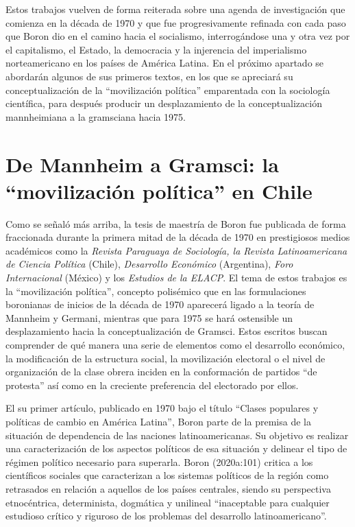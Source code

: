 Estos trabajos vuelven de forma reiterada sobre una agenda de investigación que comienza en la década de 1970 y que fue progresivamente refinada con cada paso que Boron dio en el camino hacia el socialismo, interrogándose una y otra vez por el capitalismo, el Estado, la democracia y la injerencia del imperialismo norteamericano en los países de América Latina. En el próximo apartado se abordarán algunos de sus primeros textos, en los que se apreciará su conceptualización de la \enquote{movilización política} emparentada con la sociología científica, para después producir un desplazamiento de la conceptualización mannheimiana a la gramsciana hacia 1975.

\section{De Mannheim a Gramsci: la \enquote{movilización política} en Chile}

Como se señaló más arriba, la tesis de maestría de Boron fue publicada de forma fraccionada durante la primera mitad de la década de 1970 en prestigiosos medios académicos como la \emph{Revista Paraguaya de Sociología, la Revista Latinoamericana de Ciencia Política} (Chile), \emph{Desarrollo Económico} (Argentina), \emph{Foro Internacional} (México) y los \emph{Estudios de la ELACP}. El tema de estos trabajos es la \enquote{movilización política}, concepto polisémico que en las formulaciones boronianas de inicios de la década de 1970 aparecerá ligado a la teoría de Mannheim y Germani, mientras que para 1975 se hará ostensible un desplazamiento hacia la conceptualización de Gramsci. Estos escritos buscan comprender de qué manera una serie de elementos como el desarrollo económico, la modificación de la estructura social, la movilización electoral o el nivel de organización de la clase obrera inciden en la conformación de partidos \enquote{de protesta} así como en la creciente preferencia del electorado por ellos.

El su primer artículo, publicado en 1970 bajo el título \enquote{Clases populares y políticas de cambio en América Latina}, Boron parte de la premisa de la situación de dependencia de las naciones latinoamericanas. Su objetivo es realizar una caracterización de los aspectos políticos de esa situación y delinear el tipo de régimen político necesario para superarla. Boron (2020a:101) critica a los científicos sociales que caracterizan a los sistemas políticos de la región como retrasados en relación a aquellos de los países centrales, siendo su perspectiva etnocéntrica, determinista, dogmática y unilineal \enquote{inaceptable para cualquier estudioso crítico y riguroso de los problemas del desarrollo latinoamericano}.


